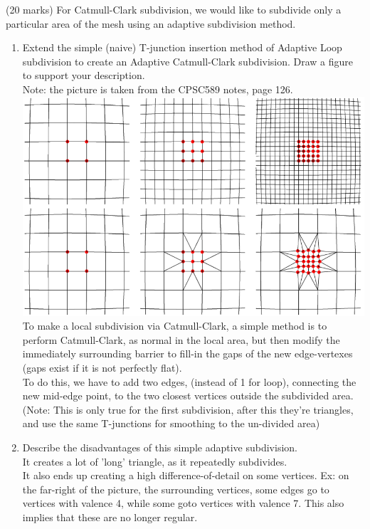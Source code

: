 (20 marks) For Catmull-Clark subdivision, we would like to subdivide only a particular area
of the mesh using an adaptive subdivision method.
\begin{enumerate}
\item Extend the simple (naive) T-junction insertion method of Adaptive Loop subdivision to create an Adaptive Catmull-Clark subdivision. Draw a figure to support your description. \\
Note: the picture is taken from the CPSC589 notes, page 126. \\
\includegraphics[width=400bp]{q6_pic.png} \\
To make a local subdivision via Catmull-Clark, a simple method is to perform Catmull-Clark, as normal in the local area, but then modify the immediately surrounding barrier to fill-in the gaps of the new edge-vertexes (gaps exist if it is not perfectly flat). \\
To do this, we have to add two edges, (instead of 1 for loop), connecting the new mid-edge point, to the two closest vertices outside the subdivided area. \\
(Note: This is only true for the first subdivision, after this they're triangles, and use the same T-junctions for smoothing to the un-divided area)\\

\item Describe the disadvantages of this simple adaptive subdivision. \\
It creates a lot of 'long' triangle, as it repeatedly subdivides. \\
It also ends up creating a high difference-of-detail on some vertices. Ex: on the far-right of the picture, the surrounding vertices, some edges go to vertices with valence 4, while some goto vertices with valence 7. This also implies that these are no longer regular. \\

\end{enumerate}

